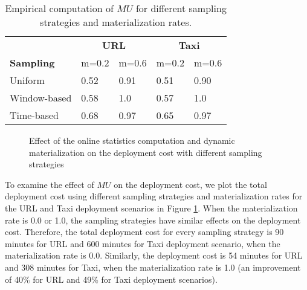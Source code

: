 \begin{table}[!h]
\begin{tabular}{lllll}
\hline
& \multicolumn{2}{c}{\textbf{URL}}  & \multicolumn{2}{c}{\textbf{Taxi}} \\
 \cmidrule(lr){2-3} \cmidrule(lr){4-5} 
\textbf{Sampling}  & \multicolumn{1}{l}{m=0.2} & \multicolumn{1}{l}{m=0.6} 
 &  \multicolumn{1}{l}{m=0.2} & \multicolumn{1}{l}{m=0.6}  \\
\hline
Uniform      	&  0.52 & 0.91 & 0.51 & 0.90 \\
Window-based &  0.58 	& 1.0 & 0.57 & 1.0 \\
Time-based &   0.68 	&  0.97 & 0.65 & 0.97 \\ \hline      
\end{tabular}
\caption{Empirical computation of $MU$ for different sampling strategies and materialization rates.}
\label{table-empirical-mu}
 \vspace{-31pt}
\end{table}
\begin{figure}[!h]
\centering
\resizebox{\columnwidth}{!}{}
\caption{Effect of the online statistics computation and dynamic materialization on the deployment cost with different sampling strategies}
 \vspace{-20pt}
\label{fig-optimization-effect}
\end{figure}

To examine the effect of $MU$ on the deployment cost, we plot the total deployment cost using different sampling strategies and materialization rates for the URL and Taxi deployment scenarios in Figure \ref{fig-optimization-effect}.
When the materialization rate is 0.0 or 1.0, the sampling strategies have similar effects on the deployment cost. 
Therefore, the total deployment cost for every sampling strategy is 90 minutes for URL and 600 minutes for Taxi deployment scenario, when the materialization rate is 0.0.
Similarly, the deployment cost is 54 minutes for URL and 308 minutes for Taxi, when the materialization rate is 1.0 (an improvement of 40\% for URL and 49\% for Taxi deployment scenarios).

